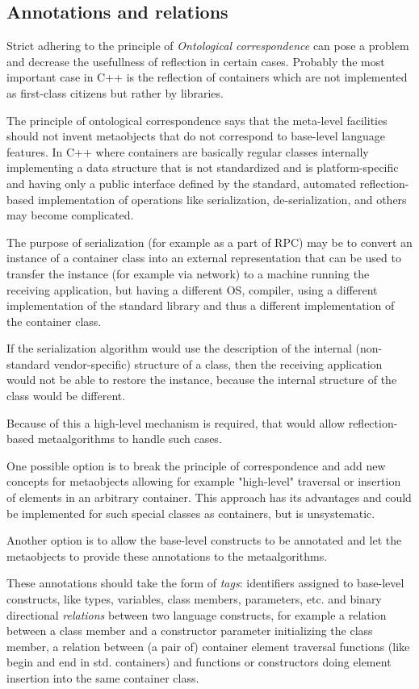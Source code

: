 \subsection{Annotations and relations}

Strict adhering to the principle of {\em Ontological correspondence} can pose
a problem and decrease the usefullness of reflection in certain cases.
Probably the most important case in C++ is the reflection of containers
which are not implemented as first-class citizens but rather by libraries.

The principle of ontological correspondence says that the meta-level facilities
should not invent metaobjects that do not correspond to base-level
language features. In C++ where containers are basically regular
classes internally implementing a data structure that is not standardized
and is platform-specific and having only a public interface defined 
by the standard, automated reflection-based implementation of operations
like serialization, de-serialization, and others may become complicated.

The purpose of serialization (for example as a part of RPC) may be to
convert an instance of a container class into an external representation
that can be used to transfer the instance (for example via network) 
to a machine running the receiving application, but having a different
OS, compiler, using a different implementation of the standard library
and thus a different implementation of the container class.

If the serialization algorithm would use the description of the internal
(non-standard vendor-specific) structure of a class, then the receiving
application would not be able to restore the instance, because the 
internal structure of the class would be different.

Because of this a high-level mechanism is required, that would allow
reflection-based metaalgorithms to handle such cases.

One possible option is to break the principle of correspondence
and add new concepts for metaobjects allowing for example
"high-level" traversal or insertion of elements in an arbitrary
container. This approach has its advantages and could be implemented
for such special classes as containers, but is unsystematic.

Another option is to allow the base-level constructs to be annotated
and let the metaobjects to provide these annotations to the metaalgorithms.

These annotations should take the form of {\em tags}: identifiers assigned
to base-level constructs, like types, variables, class members, parameters,
etc. and binary directional {\em relations} between two language constructs,
for example a relation between a class member and a constructor parameter
initializing the class member, a relation between (a pair of) container
element traversal functions (like begin and end in std. containers) and 
functions or constructors doing element insertion into the same container
class.
